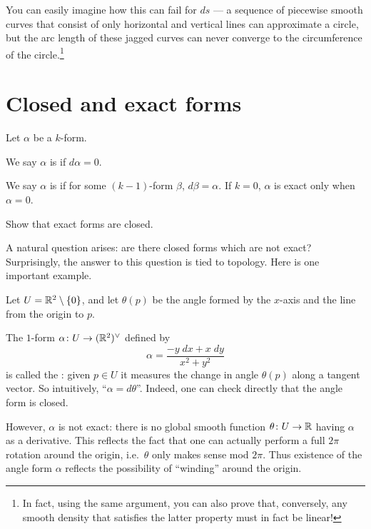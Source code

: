 You can easily imagine how this can fail for $ds$ --- a sequence of piecewise smooth curves
that consist of only horizontal and vertical lines can approximate a circle, but the arc length of
these jagged curves can never converge to the circumference of the circle.\footnote{In fact, using
the same argument, you can also prove that, conversely, any smooth density that satisfies the latter
property must in fact be linear!}

\section{Closed and exact forms}
Let $\alpha$ be a $k$-form.
\begin{definition}
	We say $\alpha$ is  if $d\alpha = 0$.
\end{definition}
\begin{definition}
	We say $\alpha$ is  if for some $(k-1)$-form $\beta$,
	$d\beta = \alpha$.  If $k = 0$, $\alpha$ is exact only when $\alpha = 0$.
\end{definition}
\begin{ques}
	Show that exact forms are closed.
\end{ques}

A natural question arises: are there closed forms
which are not exact?
Surprisingly, the answer to this question is tied to topology.
Here is one important example.

\begin{example}
	\label{ex:angle_form}
	Let $U = \mathbb R^2 \setminus \{0\}$,
	and let $\theta(p)$ be the angle formed by the $x$-axis
	and the line from the origin to $p$.

	The $1$-form $\alpha \colon U \to (\mathbb R^2)^\vee$ defined by
	\[ \alpha = \frac{-y \; dx + x \; dy}{x^2+y^2} \]
	is called the :
	given $p \in U$ it measures the change in angle $\theta(p)$
	along a tangent vector.
	So intuitively, ``$\alpha = d\theta$''.
	Indeed, one can check directly that the angle form is closed.

	However, $\alpha$ is not exact: there is no global smooth
	function $\theta \colon U \to \mathbb R$ having $\alpha$ as a derivative.
	This reflects the fact that one can actually perform
	a full $2\pi$ rotation around the origin, i.e.\ $\theta$
	only makes sense mod $2\pi$.
	Thus existence of the angle form $\alpha$ reflects
	the possibility of ``winding'' around the origin.
\end{example}

